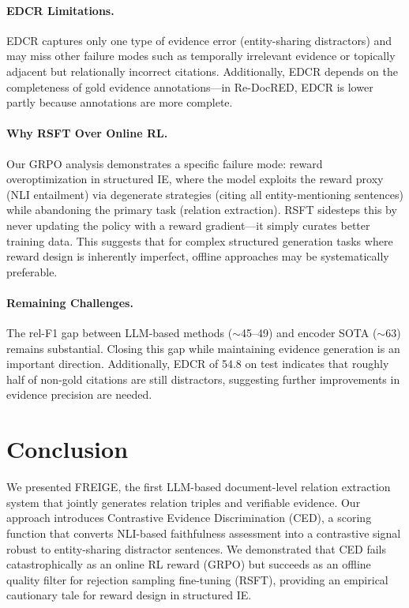 \documentclass[11pt,a4paper]{article}
\newcommand{\method}{FREIGE}
\begin{document}
\paragraph{EDCR Limitations.}
EDCR captures only one type of evidence error (entity-sharing distractors) and may miss other failure modes such as temporally irrelevant evidence or topically adjacent but relationally incorrect citations. Additionally, EDCR depends on the completeness of gold evidence annotations---in Re-DocRED, EDCR is lower partly because annotations are more complete.

\paragraph{Why RSFT Over Online RL.}
Our GRPO analysis demonstrates a specific failure mode: reward overoptimization in structured IE, where the model exploits the reward proxy (NLI entailment) via degenerate strategies (citing all entity-mentioning sentences) while abandoning the primary task (relation extraction). RSFT sidesteps this by never updating the policy with a reward gradient---it simply curates better training data. This suggests that for complex structured generation tasks where reward design is inherently imperfect, offline approaches may be systematically preferable.

\paragraph{Remaining Challenges.}
The rel-F1 gap between LLM-based methods (${\sim}$45--49) and encoder SOTA (${\sim}$63) remains substantial. Closing this gap while maintaining evidence generation is an important direction. Additionally, EDCR of 54.8 on test indicates that roughly half of non-gold citations are still distractors, suggesting further improvements in evidence precision are needed.

\section{Conclusion}

We presented \method{}, the first LLM-based document-level relation extraction system that jointly generates relation triples and verifiable evidence. Our approach introduces Contrastive Evidence Discrimination (CED), a scoring function that converts NLI-based faithfulness assessment into a contrastive signal robust to entity-sharing distractor sentences. We demonstrated that CED fails catastrophically as an online RL reward (GRPO) but succeeds as an offline quality filter for rejection sampling fine-tuning (RSFT), providing an empirical cautionary tale for reward design in structured IE.
\end{document}
